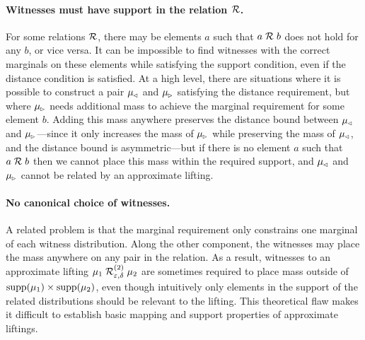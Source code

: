\documentclass{lmcs}
\begin{document}
\paragraph*{Witnesses must have support in the relation $\mathrel{\mathcal{R}}$.}
For some relations $\mathrel{\mathcal{R}}$, there may be elements $a$ such that $a \mathrel{\mathrel{\mathcal{R}}}
b$ does not hold for any $b$, or vice versa. It can be impossible to find
witnesses with the correct marginals on these elements while satisfying the
support condition, even if the distance condition is satisfied. At a high level,
there are situations where it is possible to construct a pair $\mu_{\mspace{-1.5mu}{\scriptscriptstyle \vartriangleleft}}$ and
$\mu_{\mspace{-1.5mu}{\scriptscriptstyle \vartriangleright}}$ satisfying the distance requirement, but where $\mu_{\mspace{-1.5mu}{\scriptscriptstyle \vartriangleright}}$ needs
additional mass to achieve the marginal requirement for some element $b$. Adding
this mass anywhere preserves the distance bound between $\mu_{\mspace{-1.5mu}{\scriptscriptstyle \vartriangleleft}}$ and
$\mu_{\mspace{-1.5mu}{\scriptscriptstyle \vartriangleright}}$---since it only increases the mass of $\mu_{\mspace{-1.5mu}{\scriptscriptstyle \vartriangleright}}$ while preserving
the mass of $\mu_{\mspace{-1.5mu}{\scriptscriptstyle \vartriangleleft}}$, and the distance bound is asymmetric---but if there is
no element $a$ such that $a \mathrel{\mathrel{\mathcal{R}}} b$ then we cannot place this mass
within the required support, and $\mu_{\mspace{-1.5mu}{\scriptscriptstyle \vartriangleleft}}$ and $\mu_{\mspace{-1.5mu}{\scriptscriptstyle \vartriangleright}}$ cannot be related
by an approximate lifting.

\paragraph*{No canonical choice of witnesses.}
A related problem is that the marginal requirement only constrains one marginal
of each witness distribution. Along the other component, the witnesses may place
the mass anywhere on any pair in the relation. As a result, witnesses to an
approximate lifting $\mu_1 \mathrel{\mathrel{\mathcal{R}}^{(2)}_{\varepsilon, \delta}} \mu_2$ are
sometimes required to place mass outside of $\operatorname{supp}(\mu_1) \times \operatorname{supp}(\mu_2)$,
even though intuitively only elements in the support of the related
distributions should be relevant to the lifting. This theoretical flaw makes it
difficult to establish basic mapping and support properties of approximate
liftings.
\end{document}
